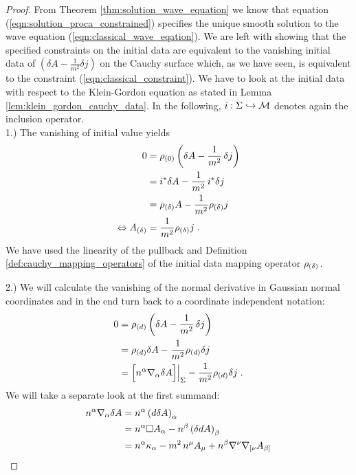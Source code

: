 \begin{proof}
From Theorem \ref{thm:solution_wave_equation} we know that equation (\ref{eqn:solution_proca_constrained}) specifies the unique smooth solution to the wave equation (\ref{eqn:classical_wave_eqation}). We are left with showing that the specified constraints on the initial data are equivalent to the vanishing initial data of $(\delta A - \frac{1}{m^2} \delta j)$ on the Cauchy surface which, as we have seen, is equivalent to the constraint (\ref{eqn:classical_constraint}).
We have to look at the initial data with respect to the Klein-Gordon equation as stated in Lemma \ref{lem:klein_gordon_cauchy_data}. In the following, $i : \Sigma \hookrightarrow \mathcal{M}$ denotes again the inclusion operator.\\
1.) The vanishing of initial value yields
\begin{align}
0 &= \rho_{(0)} \left( \delta A - \frac{1}{m^2}\, \delta j\right) \notag\\
&= i^* \delta A - \frac{1}{m^2}\, i^* \delta j \notag \\
&= \rho_{(\delta)} A - \frac{1}{m^2} \rho_{(\delta)} j \notag \\
\Leftrightarrow {A_{(\delta)}} &= \frac{1}{m^2} \rho_{(\delta)} j \;.
\end{align}
We have used the linearity of the pullback and Definition \ref{def:cauchy_mapping_operators} of the initial data mapping operator $\rho_{(\delta)}$. \par
%
%
%
2.) We will calculate the vanishing of the normal derivative in Gaussian normal coordinates and in the end turn back to a coordinate independent notation:
\begin{align}
0 &= \rhod \left( \delta A - \frac{1}{m^2}\, \delta j\right) \notag \\
 &= \rhod \delta A  - \frac{1}{m^2} \rhod  \delta j \notag \\
 &= \restr{\Big[n^\alpha \nabla_\alpha  \delta A \Big]}{\Sigma} - \frac{1}{m^2} \rhod  \delta j  \formspace. \label{eqn:cauchy_normal_derivative_tmp}
\end{align}
We will take a separate look at the first summand:
\begin{align}
n^\alpha \nabla_\alpha  \delta A
&= n^\alpha \left( d\delta A \right)_{\alpha} \notag\\
&= n^\alpha \square A_\alpha - n^\beta \left( \delta  d A \right)_\beta \notag\\
&= n^\alpha \kappa_\alpha -{m^2} \, n^\mu A_\mu + n^\beta \nabla^\nu \nabla_{[\nu} A_{\beta]} \notag\\

\end{align}
\end{proof}
